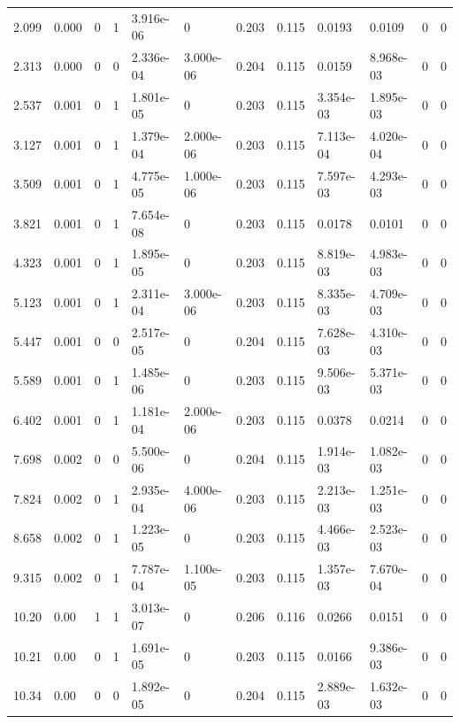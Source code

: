 \documentclass[preview]{standalone}
\begin{document}
{{\begin{tabular}{L{1.2cm}C{1.2cm} C{0.3cm}C{0.5cm} C{1.4cm}C{1.4cm} C{1.4cm}C{1.4cm} C{1.6cm}C{1.6cm} C{1.6cm}C{1.6cm}}
  2.099  &  0.000  & 0     &  1 &  3.916e-06  & 0  &  0.203&   0.115& 0.0193 & 0.0109   &  0 & 0  \\ 
  2.313  &  0.000  & 0     &  0 &  2.336e-04  & 3.000e-06  &  0.204&   0.115& 0.0159 & 8.968e-03   &  0 & 0  \\ 
  2.537  &  0.001  & 0     &  1 &  1.801e-05  & 0  &  0.203&   0.115& 3.354e-03 & 1.895e-03   &  0 & 0  \\ 
  3.127  &  0.001  & 0     &  1 &  1.379e-04  & 2.000e-06  &  0.203&   0.115& 7.113e-04 & 4.020e-04   &  0 & 0  \\ 
  3.509  &  0.001  & 0     &  1 &  4.775e-05  & 1.000e-06  &  0.203&   0.115& 7.597e-03 & 4.293e-03   &  0 & 0  \\ 
  3.821  &  0.001  & 0     &  1 &  7.654e-08  & 0  &  0.203&   0.115& 0.0178 & 0.0101   &  0 & 0  \\ 
  4.323  &  0.001  & 0     &  1 &  1.895e-05  & 0  &  0.203&   0.115& 8.819e-03 & 4.983e-03   &  0 & 0  \\ 
  5.123  &  0.001  & 0     &  1 &  2.311e-04  & 3.000e-06  &  0.203&   0.115& 8.335e-03 & 4.709e-03   &  0 & 0  \\ 
  5.447  &  0.001  & 0     &  0 &  2.517e-05  & 0  &  0.204&   0.115& 7.628e-03 & 4.310e-03   &  0 & 0  \\ 
  5.589  &  0.001  & 0     &  1 &  1.485e-06  & 0  &  0.203&   0.115& 9.506e-03 & 5.371e-03   &  0 & 0  \\ 
  6.402  &  0.001  & 0     &  1 &  1.181e-04  & 2.000e-06  &  0.203&   0.115& 0.0378 & 0.0214   &  0 & 0  \\ 
  7.698  &  0.002  & 0     &  0 &  5.500e-06  & 0  &  0.204&   0.115& 1.914e-03 & 1.082e-03   &  0 & 0  \\ 
  7.824  &  0.002  & 0     &  1 &  2.935e-04  & 4.000e-06  &  0.203&   0.115& 2.213e-03 & 1.251e-03   &  0 & 0  \\ 
  8.658  &  0.002  & 0     &  1 &  1.223e-05  & 0  &  0.203&   0.115& 4.466e-03 & 2.523e-03   &  0 & 0  \\ 
  9.315  &  0.002  & 0     &  1 &  7.787e-04  & 1.100e-05  &  0.203&   0.115& 1.357e-03 & 7.670e-04   &  0 & 0  \\ 
  10.20  &  0.00  & 1     &  1 &  3.013e-07  & 0  &  0.206&   0.116& 0.0266 & 0.0151   &  0 & 0  \\ 
  10.21  &  0.00  & 0     &  1 &  1.691e-05  & 0  &  0.203&   0.115& 0.0166 & 9.386e-03   &  0 & 0  \\ 
  10.34  &  0.00  & 0     &  0 &  1.892e-05  & 0  &  0.204&   0.115& 2.889e-03 & 1.632e-03   &  0 & 0  \\ 

\end{tabular}}}
\end{document}
